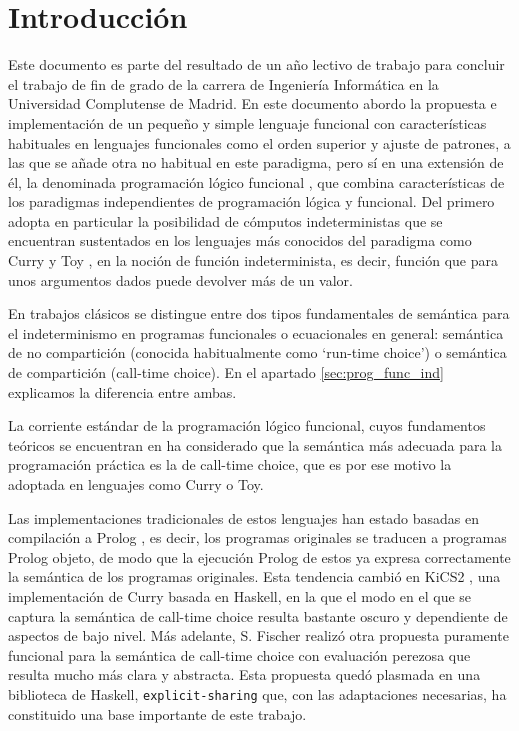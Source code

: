 \documentclass[class=article, crop=false]{standalone}
\begin{document}
\section{Introducción}
Este documento es parte del resultado de un año lectivo de trabajo para concluir el trabajo
de fin de grado de la carrera de Ingeniería Informática en la Universidad Complutense de
Madrid. En este documento abordo la propuesta e implementación de un pequeño y simple
lenguaje funcional con características habituales en lenguajes funcionales como el orden
superior y ajuste de patrones, a las que se añade otra no habitual en este paradigma, pero sí
en una extensión de él, la denominada programación lógico
funcional \cite{antoy2010functional}, que combina características de los paradigmas
independientes de programación lógica y funcional. Del primero adopta en particular la
posibilidad de cómputos indeterministas que se encuentran sustentados en los lenguajes más
conocidos del paradigma como Curry \cite{Hanus16Curry} y Toy \cite{fraguas1999toy}, en la
noción de función indeterminista, es decir, función que para unos argumentos dados puede
devolver más de un valor.

En trabajos clásicos \cite{hussmann1993nondeterminism} se distingue entre dos tipos
fundamentales de  semántica para el indeterminismo en programas funcionales o ecuacionales en
general: semántica de no compartición (conocida habitualmente como `run-time choice') o
semántica de compartición (call-time choice). En el apartado \ref{sec:prog_func_ind}
explicamos la diferencia entre ambas.

La corriente estándar de la programación lógico funcional, cuyos fundamentos teóricos se
encuentran en \cite{DBLP:journals/jlp/Gonzalez-MorenoHLR99} ha considerado que la semántica
más adecuada para la programación práctica es la de call-time choice, que es por ese motivo
la adoptada en lenguajes como Curry o Toy.

Las implementaciones tradicionales de estos lenguajes han estado basadas en compilación a
Prolog \cite{deransart2012prolog}, es decir, los programas originales se traducen a programas
Prolog objeto, de modo que la ejecución Prolog de estos ya expresa correctamente la semántica
de los programas originales. Esta tendencia cambió en KiCS2
\cite{BrasselHanusPeemoellerReck11}, una implementación de Curry basada en Haskell, en la que
el modo en el que se captura la semántica de call-time choice resulta bastante oscuro y
dependiente de aspectos de bajo nivel. Más adelante, S. Fischer realizó otra propuesta
puramente funcional para la semántica de call-time choice con evaluación
perezosa \cite{fischer2011purely} que resulta mucho más clara y abstracta. Esta propuesta
quedó plasmada en una biblioteca de Haskell, \verb`explicit-sharing` que, con las
adaptaciones necesarias, ha constituido una base importante de este trabajo.
\end{document}
